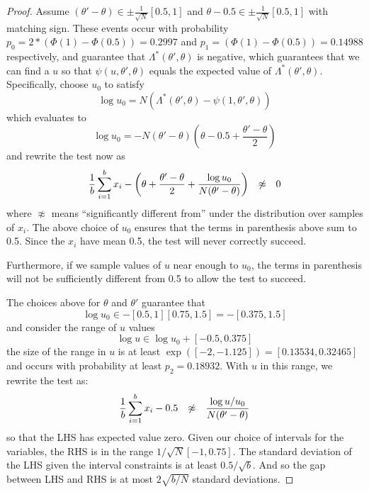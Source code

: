 \documentclass{article}
\begin{document}
\begin{proof} Assume $(\theta' - \theta) \in \pm\frac{1}{\sqrt{N}}[0.5,1]$ and
  $\theta -0.5 \in \pm\frac{1}{\sqrt{N}}[0.5,1]$ with matching sign. These events
  occur with probability $p_0=2*(\Phi(1)-\Phi(0.5)) = 0.2997$ and $p_1=(\Phi(1)-\Phi(0.5))=0.14988$ respectively,
  and guarantee that $\Lambda^*(\theta',\theta)$ is negative, which guarantees that we can find
  a $u$ so that $\psi(u,\theta',\theta)$ equals the expected value of $\Lambda^*(\theta',\theta)$.
  Specifically, choose $u_0$
  to satisfy
  \begin{equation}
    \log u_0 = N(\Lambda^*(\theta',\theta)-\psi(1,\theta',\theta))
  \end{equation}
  which evaluates to 
  \begin{equation}
    \log u_0 = -N(\theta'-\theta)\left(\theta-0.5+\frac{\theta'-\theta}{2}\right) 
  \end{equation}
  and rewrite the test now as
  \begin{equation}
    \frac{1}{b}\sum_{i=1}^b x_i-\left(\theta+\frac{\theta'-\theta}{2} + \frac{\log u_0}{N(\theta'-\theta)}\right)
    \hspace{0.1in} \not\approx \hspace{0.1in} 0
  \end{equation}
  where $\not\approx$ means ``significantly different from'' under the distribution over samples of $x_i$. 
  The above choice of $u_0$ ensures that the terms in parenthesis above sum to 0.5. Since the $x_i$ have mean 0.5, the
  test will never correctly succeed.

  Furthermore, if we sample values of $u$ near enough to $u_0$, the terms in parenthesis will not be sufficiently different
  from 0.5 to allow the test to succeed. 
  
 The choices above for $\theta$ and $\theta'$ guarantee that
  \begin{equation}
    \log u_0 \in -[0.5,1][0.75,1.5] = -[0.375,1.5]
        \end{equation}
and consider the range of $u$ values
  \begin{equation}
    \log u \in \log u_0 + [-0.5,0.375]
  \end{equation}
  the size of the range in $u$ is at least $\exp([-2,-1.125]) = [0.13534,0.32465]$ and occurs
  with probability at least $p_2=0.18932$. With $u$ in this range, we rewrite the test as:
  \begin{equation}
    \frac{1}{b}\sum_{i=1}^b x_i-0.5 \hspace{0.1in} \not\approx \hspace{0.1in} \frac{\log u/u_0}{N(\theta'-\theta)}
  \end{equation}
  so that the LHS has expected value zero.  Given our choice of intervals for the variables, the RHS is in the range $1/\sqrt{N}[-1,0.75]$.
  The standard deviation of the LHS given the interval constraints is at least $0.5/\sqrt{b}$. And
  so the gap between LHS and RHS is at most $2\sqrt{b/N}$ standard deviations. 



\end{proof}
\end{document}
